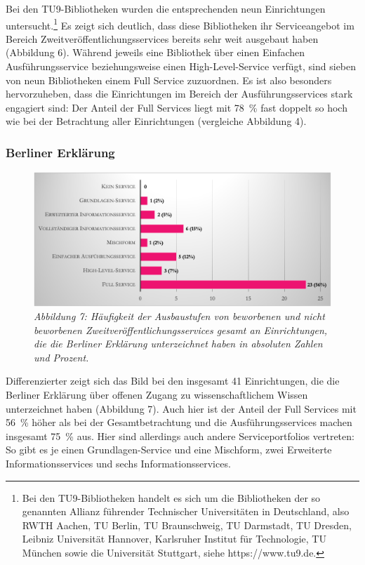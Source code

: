 \documentclass[a4paper,
fontsize=11pt,
oneside,
numbers=noperiodatend,
parskip=half-,
bibliography=totoc,
final
]{scrartcl}
\begin{document}
Bei den TU9-Bibliotheken wurden die entsprechenden neun Einrichtungen
untersucht.\footnote{Bei den TU9-Bibliotheken handelt es sich um die
  Bibliotheken der so genannten Allianz führender Technischer
  Universitäten in Deutschland, also RWTH Aachen, TU Berlin, TU
  Braunschweig, TU Darmstadt, TU Dresden, Leibniz Universität Hannover,
  Karlsruher Institut für Technologie, TU München sowie die Universität
  Stuttgart, siehe https://www.tu9.de.} Es zeigt sich deutlich, dass
diese Bibliotheken ihr Serviceangebot im Bereich
Zweitveröffentlichungsservices bereits sehr weit ausgebaut haben
(Abbildung 6). Während jeweils eine Bibliothek über einen Einfachen
Ausführungsservice beziehungsweise einen High-Level-Service verfügt,
sind sieben von neun Bibliotheken einem Full Service zuzuordnen. Es ist
also besonders hervorzuheben, dass die Einrichtungen im Bereich der
Ausführungsservices stark engagiert sind: Der Anteil der Full Services
liegt mit 78~\% fast doppelt so hoch wie bei der Betrachtung aller
Einrichtungen (vergleiche Abbildung 4).

\hypertarget{berliner-erkluxe4rung}{%
\subsubsection{Berliner Erklärung}\label{berliner-erkluxe4rung}}

\begin{figure}[h!]
\centering
\includegraphics[width=.9\textwidth]{img/abb7.png}
\caption{\textit{Abbildung 7: Häufigkeit der Ausbaustufen von beworbenen und
nicht beworbenen Zweitveröffentlichungsservices gesamt an Einrichtungen,
die die Berliner Erklärung unterzeichnet haben in absoluten Zahlen und
Prozent.}}
\end{figure}

Differenzierter zeigt sich das Bild bei den insgesamt 41 Einrichtungen,
die die Berliner Erklärung über offenen Zugang zu wissenschaftlichem
Wissen unterzeichnet haben (Abbildung 7). Auch hier ist der Anteil der
Full Services mit 56~\% höher als bei der Gesamtbetrachtung und die
Ausführungsservices machen insgesamt 75~\% aus. Hier sind allerdings
auch andere Serviceportfolios vertreten: So gibt es je einen
Grundlagen-Service und eine Mischform, zwei Erweiterte
Informationsservices und sechs Informationsservices.
\end{document}
